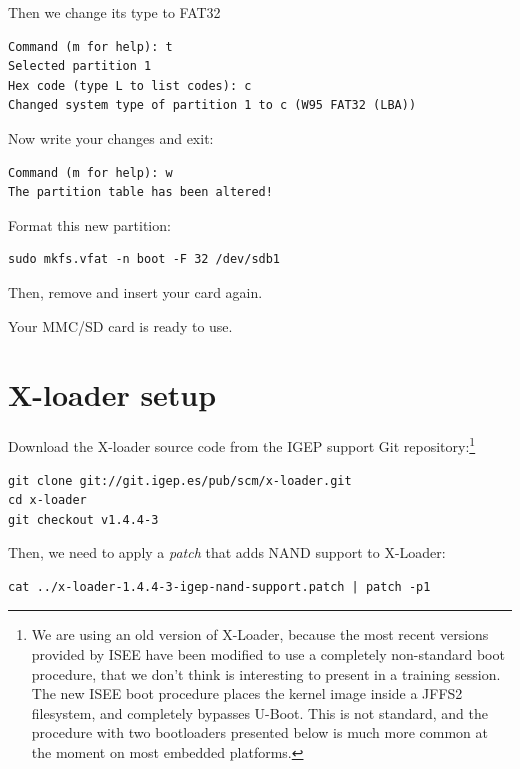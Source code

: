 Then we change its type to FAT32

\begin{verbatim}
Command (m for help): t
Selected partition 1
Hex code (type L to list codes): c
Changed system type of partition 1 to c (W95 FAT32 (LBA))
\end{verbatim}

Now write your changes and exit: 

\begin{verbatim}
Command (m for help): w 
The partition table has been altered! 
\end{verbatim}

Format this new partition:

\begin{verbatim}
sudo mkfs.vfat -n boot -F 32 /dev/sdb1
\end{verbatim}

Then, remove and insert your card again.

Your MMC/SD card is ready to use.

\section{X-loader setup}

Download the X-loader source code from the IGEP support Git
repository:\footnote{We are using an old version of X-Loader, because
  the most recent versions provided by ISEE have been modified to use
  a completely non-standard boot procedure, that we don't think is
  interesting to present in a training session. The new ISEE boot
  procedure places the kernel image inside a JFFS2 filesystem, and
  completely bypasses U-Boot. This is not standard, and the procedure
  with two bootloaders presented below is much more common at the
  moment on most embedded platforms.}

\begin{verbatim}
git clone git://git.igep.es/pub/scm/x-loader.git
cd x-loader
git checkout v1.4.4-3
\end{verbatim}

Then, we need to apply a {\em patch} that adds NAND support to
X-Loader:

\begin{verbatim}
cat ../x-loader-1.4.4-3-igep-nand-support.patch | patch -p1
\end{verbatim}

